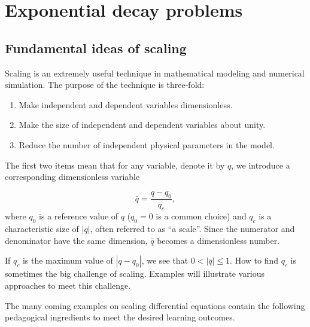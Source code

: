 \documentclass[graybox,envcountchap,sectrefs,final]{svmonodo}
\begin{document}
\section{Exponential decay problems}
\label{sec:scale:decay}

\subsection{Fundamental ideas of scaling}



Scaling is an extremely useful technique in mathematical modeling and
numerical simulation.  The purpose of the technique is three-fold:

\begin{enumerate}
\item Make independent and dependent variables dimensionless.

\item Make the size of independent and dependent variables about unity.

\item Reduce the number of independent physical parameters in the model.
\end{enumerate}

\noindent
{}

The first two items mean that for any variable, denote it by
$q$, we introduce a corresponding dimensionless variable

\[ \bar q = \frac{q-q_0}{q_c},\]
where $q_0$ is a reference value of $q$ ($q_0=0$ is a common choice) and
$q_c$ is a characteristic size of $|q|$, often referred to as ``a scale''.
Since the numerator and denominator
have the same dimension, $\bar q$ becomes a dimensionless number.

If $q_c$ is the maximum value of $|q-q_0|$, we see that $0 < |\bar
q|\leq 1$. How to find $q_c$ is sometimes the big challenge of
scaling. Examples will illustrate various approaches to meet this
challenge.

The many coming examples on scaling differential equations contain
the following pedagogical ingredients to meet the desired learning outcomes.
\end{document}
